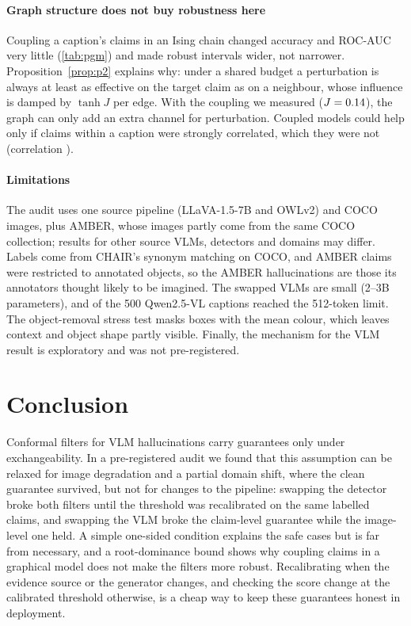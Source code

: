 \paragraph{Graph structure does not buy robustness here} Coupling a caption's claims in an Ising chain changed accuracy and ROC-AUC very little (\cref{tab:pgm}) and made robust intervals wider, not narrower. Proposition~\ref{prop:p2} explains why: under a shared budget a perturbation is always at least as effective on the target claim as on a neighbour, whose influence is damped by $\tanh J$ per edge. With the coupling we measured ($J=0.14{}$), the graph can only add an extra channel for perturbation. Coupled models could help only if claims within a caption were strongly correlated, which they were not (correlation \CorrTest{}).

\paragraph{Limitations} The audit uses one source pipeline (LLaVA-1.5-7B and OWLv2) and COCO images, plus AMBER, whose images partly come from the same COCO collection; results for other source VLMs, detectors and domains may differ. Labels come from CHAIR's synonym matching on COCO, and AMBER claims were restricted to annotated objects, so the AMBER hallucinations are those its annotators thought likely to be imagined. The swapped VLMs are small (2--3B parameters), and \TruncQwen{} of the 500 Qwen2.5-VL captions reached the 512-token limit. The object-removal stress test masks boxes with the mean colour, which leaves context and object shape partly visible. Finally, the mechanism for the VLM result is exploratory and was not pre-registered.

\section{Conclusion}
Conformal filters for VLM hallucinations carry guarantees only under exchangeability. In a pre-registered audit we found that this assumption can be relaxed for image degradation and a partial domain shift, where the clean guarantee survived, but not for changes to the pipeline: swapping the detector broke both filters until the threshold was recalibrated on the same labelled claims, and swapping the VLM broke the claim-level guarantee while the image-level one held. A simple one-sided condition explains the safe cases but is far from necessary, and a root-dominance bound shows why coupling claims in a graphical model does not make the filters more robust. Recalibrating when the evidence source or the generator changes, and checking the score change at the calibrated threshold otherwise, is a cheap way to keep these guarantees honest in deployment.

